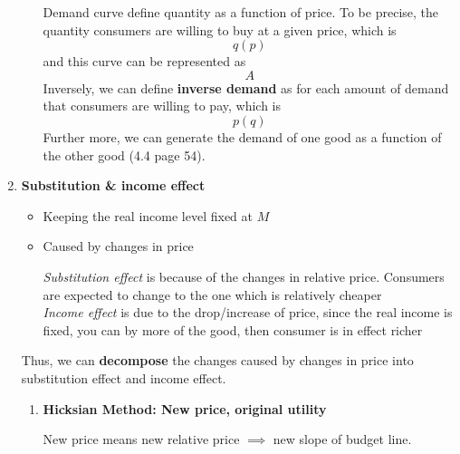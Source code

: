 \documentclass[10pt]{article}
\newenvironment{changemargin}[2]{%
  \begin{list}{}{%
    \setlength{\topsep}{0pt}%
    \setlength{\leftmargin}{#1}%
    \setlength{\rightmargin}{#2}%
    \setlength{\listparindent}{\parindent}%
    \setlength{\itemindent}{\parindent}%
    \setlength{\parsep}{\parskip}%
  }%
  \item[]}{\end{list}}
\begin{document}
\begin{changemargin}{-0.125in}{0in}
\begin{enumerate}
\begin{enumerate}
            \bigskip
            
             Demand curve define quantity as a function of price. To be precise, the quantity consumers are willing to buy at a given price, which is 
             \[
             q(p)
             \]
             and this curve can be represented as 
             \[
             A
             \]
             Inversely, we can define \textbf{inverse demand} as for each amount of demand that consumers are willing to pay, which is 
             \[
             p(q)
             \]
             Further more, we can generate the demand of one good as a function of the other good (4.4 page 54).
           \end{enumerate}
           
           \medskip
           
           \item \textbf{Substitution \& income effect}
              \begin{itemize}
                \item Keeping the real income level fixed at $M$
              	\item Caused by changes in price
              	
              	\smallskip
              	
              	
              	 \textit{Substitution effect} is because of the changes in relative price. Consumers are expected to change to the one which is relatively cheaper
              	 \\
              	 
              	\textit{Income effect} is due to the drop/increase of price, since the real income is fixed, you can by more of the good, then consumer is in effect richer
              \end{itemize}
              
              \smallskip
              Thus, we can \textbf{decompose} the changes caused by changes in price into substitution effect and income effect.
              
                \begin{enumerate}
                  \item 
                  \textbf{Hicksian Method: New price, original utility} 
                  
                  \smallskip
                  
                  New price means new relative price $\implies$ new slope of budget line. 


\end{enumerate}
\end{enumerate}
\end{changemargin}
\end{document}
